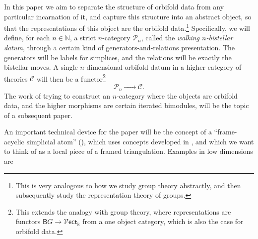 \documentclass[12pt,a4paper]{article}
\numberwithin{equation}{section}
\newcommand{\vect}{\mathscr{V} \mathsf{ect}}
\begin{document}
In this paper we aim to separate the structure of orbifold data from any particular incarnation of it, and capture this structure into an abstract object, so that the representations of this object are the orbifold data.\footnote{This is very analogous to how we study group theory abstractly, and then subsequently study the representation theory of groups.} Specifically, we will define, for each $n \in \mathbb{N}$, a strict $n$-category $\mathscr{P}_n$, called the \emph{walking $n$-bistellar datum}, through a certain kind of generators-and-relations presentation. The generators will be labels for simplices, and the relations will be exactly the bistellar moves. A single $n$-dimensional orbifold datum in a higher category of theories $\mathscr{C}$ will then be a functor\footnote{This extends the analogy with group theory, where representations are functors $\mathsf{B}G \to \vect_{\mathbb{k}}$ from a one object category, which is also the case for orbifold data.}
%
\begin{equation}
    \mathscr{P}_n \xrightarrow{\qquad \ \ } \mathscr{C}.
\end{equation}
%
The work of trying to construct an $n$-category where the objects are orbifold data, and the higher morphisms are certain iterated bimodules, will be the topic of a subsequent paper.

An important technical device for the paper will be the concept of a ``frame-acyclic simplicial atom'' (), which uses concepts developed in \cite{hadzihasanovic}, and which we want to think of as a local piece of a framed triangulation. Examples in low dimensions are
\end{document}
